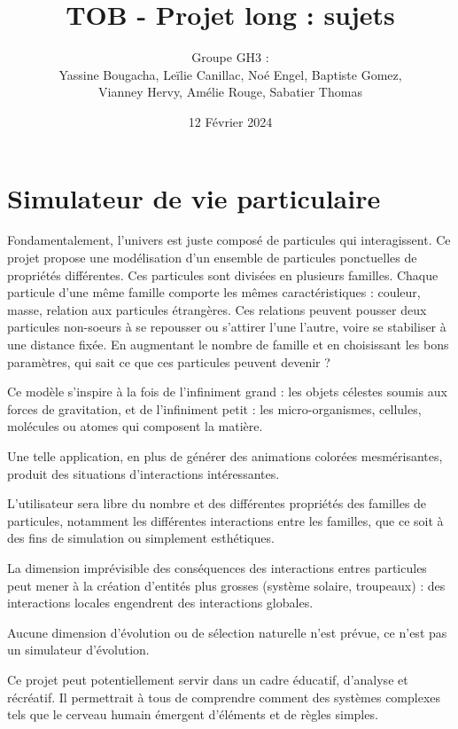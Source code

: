 \documentclass{article}
\title{TOB - Projet long : sujets}
\author{Groupe GH3 : \\ Yassine Bougacha, Leïlie Canillac, Noé Engel, Baptiste Gomez, \\ Vianney Hervy, Amélie Rouge, Sabatier Thomas}
\date{12 Février 2024}
\begin{document}
\maketitle
\newpage

\tableofcontents
\newpage

\section{Simulateur de vie particulaire}

Fondamentalement, l'univers est juste composé de particules qui interagissent. Ce projet propose une modélisation d'un ensemble de particules ponctuelles de propriétés différentes. Ces particules sont divisées en plusieurs familles. Chaque particule d'une même famille comporte les mêmes caractéristiques : couleur, masse, relation aux particules étrangères. Ces relations peuvent pousser deux particules non-soeurs à se repousser ou s'attirer l'une l'autre, voire se stabiliser à une distance fixée. En augmentant le nombre de famille et en choisissant les bons paramètres, qui sait ce que ces particules peuvent devenir ? \bigskip

Ce modèle s'inspire à la fois de l'infiniment grand : les objets célestes soumis aux forces de gravitation, et de l'infiniment petit : les micro-organismes, cellules, molécules ou atomes qui composent la matière. \bigskip

Une telle application, en plus de générer des animations colorées mesmérisantes, produit des situations d'interactions intéressantes. \bigskip

L'utilisateur sera libre du nombre et des différentes propriétés des familles de particules, notamment les différentes interactions entre les familles, que ce soit à des fins de simulation ou simplement esthétiques. \bigskip

La dimension imprévisible des conséquences des interactions entres particules peut mener à la création d'entités plus grosses (système solaire, troupeaux) : des interactions locales engendrent des interactions globales. \bigskip

Aucune dimension d'évolution ou de sélection naturelle n'est prévue, ce n'est pas un simulateur d'évolution. \bigskip

Ce projet peut potentiellement servir dans un cadre éducatif, d'analyse et récréatif. Il permettrait à tous de comprendre comment des systèmes complexes tels que le cerveau humain émergent d'éléments et de règles simples. \bigskip
\end{document}
